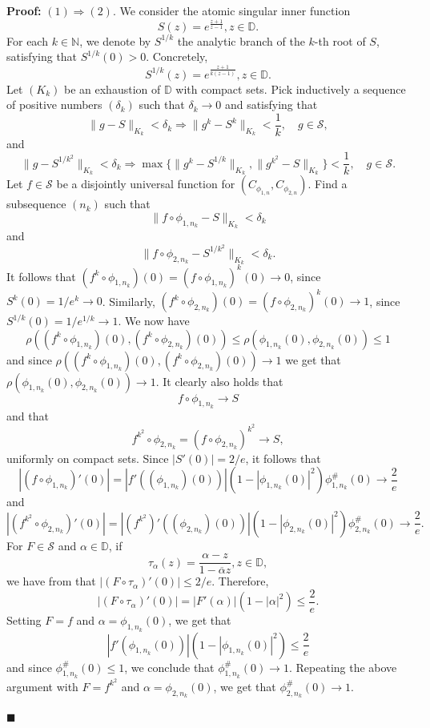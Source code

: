 \documentclass[12pt,a4paper]{amsart}
\theoremstyle{plain}
\theoremstyle{definition}
\theoremstyle{remark}
\theoremstyle{fact}
\newenvironment{pf}
{\noindent\textbf{Proof:}}
{\hfill $\blacksquare$\par\medskip}
\begin{document}
    \begin{pf}
        $(1)\Rightarrow (2)$. We consider the atomic singular inner function
        $$
        S(z)=e^{\frac{z+1}{z-1}}, z\in \mathbb{D}.
        $$
        For each $k\in \mathbb{N}$, we denote by $S^{1/k}$ the analytic branch of the $k$-th root of $S$, satisfying that $S^{1/k}(0)>0$. Concretely, 
        $$
        S^{1/k}(z)=e^{\frac{z+1}{k(z-1)}}, z\in \mathbb{D}.
        $$
        Let $(K_k)$ be an exhaustion of $\mathbb{D}$ with compact sets. Pick inductively a sequence of positive numbers $(\delta_k)$ such that $\delta_k\rightarrow 0$ and satisfying that
        $$
        \|g-S\|_{K_k}<\delta_k \Rightarrow \|g^k-S^k\|_{K_k}<\frac{1}{k}, \quad g\in \mathcal{S},
        $$
        and
        $$
        \|g-S^{1/k^2}\|_{K_k}<\delta_k \Rightarrow \max\{ \|g^k-S^{1/k}\|_{K_k}, \|g^{k^2}-S\|_{K_k}\}<\frac{1}{k}, \quad g\in \mathcal{S}.
        $$
        Let $f\in \mathcal{S}$ be a disjointly universal function for $(C_{\phi_{1, n}},C_{\phi_{2, n}})$. Find a subsequence $(n_k)$ such that
        $$
        \|f\circ \phi_{1, n_k}-S\|_{K_k}<\delta_k
        $$
        and
        $$
        \|f\circ \phi_{2, n_k}-S^{1/k^2}\|_{K_k}<\delta_k.
        $$
        It follows that $(f^k\circ \phi_{1, n_k})(0)=(f\circ \phi_{1, n_k})^k(0)\rightarrow 0$, since $S^{k}(0)=1/e^{k}\rightarrow 0$. Similarly, $(f^k\circ \phi_{2, n_k})(0)=(f\circ \phi_{2, n_k})^k(0)\rightarrow 1$, since $S^{1/k}(0)=1/e^{1/k}\rightarrow 1$. We now have
        $$
        \rho((f^k\circ \phi_{1, n_k})(0),(f^k\circ \phi_{2, n_k})(0))\leq  \rho(\phi_{1, n_k}(0),\phi_{2, n_k}(0))\leq 1
        $$
        and since $ \rho((f^k\circ \phi_{1, n_k})(0),(f^k\circ \phi_{2, n_k})(0))\rightarrow 1$ we get that $\rho(\phi_{1, n_k}(0),\phi_{2, n_k}(0))\rightarrow 1$. It clearly also holds that
        $$
        f\circ \phi_{1, n_k}\rightarrow S
        $$
        and that
        $$
        f^{k^2}\circ \phi_{2, n_k}=(f\circ \phi_{2, n_k})^{k^2}\rightarrow S,
        $$
        uniformly on compact sets. Since $|S'(0)|=2/e$, it follows that
        $$
        |(f\circ \phi_{1, n_k})'(0)|=|f'((\phi_{1, n_k})(0))|(1-|\phi_{1, n_k}(0)|^2)\phi_{1, n_k}^\#(0)\rightarrow \frac{2}{e}
        $$
        and
        $$
        |(f^{k^2}\circ \phi_{2, n_k})'(0)|=|(f^{k^2})'((\phi_{2, n_k})(0))|(1-|\phi_{2, n_k}(0)|^2)\phi_{2, n_k}^\#(0)\rightarrow \frac{2}{e}.
        $$
        For $F\in \mathcal{S}$ and $\alpha \in \mathbb{D}$, if 
        $$
        \tau_{\alpha}(z)=\frac{\alpha-z}{1-\overline{\alpha}z}, z\in \mathbb{D},
        $$
        we have from \cite[Lemma 2.6]{BGGM09} that $|(F\circ \tau_{\alpha})'(0)|\leq 2/e$. Therefore,
        $$
        |(F\circ \tau_{\alpha})'(0)|=|F'(\alpha)|(1-|\alpha|^2)\leq \frac{2}{e}.        
        $$
        Setting $F=f$ and $\alpha=\phi_{1, n_k}(0)$, we get that
        $$
        |f'(\phi_{1, n_k}(0))|(1-|\phi_{1, n_k}(0)|^2)\leq \frac{2}{e}
        $$
        and since $\phi_{1, n_k}^\#(0)\leq 1$, we conclude that $\phi_{1, n_k}^\#(0)\rightarrow 1$. Repeating the above argument with $F=f^{k^2}$ and $\alpha=\phi_{2, n_k}(0)$, we get that $\phi_{2, n_k}^\#(0)\rightarrow 1$.


\end{pf}
\end{document}
